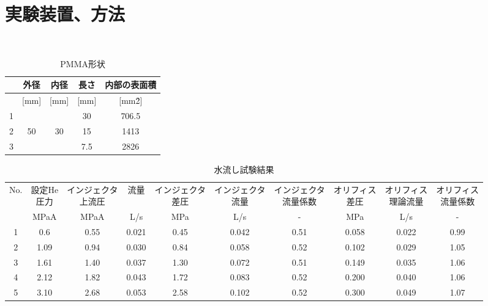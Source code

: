 \chapter{実験装置、方法}
\newcommand{\FigAddTwo}{./src/Chapter2/Figure}
%
%



\\
\begin{table}[htb]
\begin{center}
\caption{PMMA形状}
\begin{tabular}{|l|c|c|c|c|} \hline
 & 外径 & 内径  & 長さ  & 内部の表面積 \\ \hline
 & [mm] & [mm]  & [mm]  & [mm\^2]      \\ \hline
1&      &       & 30    &706.5         \\ \cline{4-5}
2& 50   & 30    & 15    &1413          \\ \cline{4-5}
3&      &       & 7.5   &2826          \\ \hline
\end{tabular}
\label{tab:PMMA}
\end{center}
\end{table}


\begin{table}[htb]
\begin{center}
\caption{水流し試験結果}
\scriptsize
\begin{tabular}{|c|c|c|c|c|c|c|c|c|c|} \hline
No. & \shortstack{設定He\\圧力} & \shortstack{インジェクタ\\上流圧} & 流量 & \shortstack{インジェクタ\\差圧} & \shortstack{インジェクタ\\流量} & \shortstack{インジェクタ\\流量係数} & \shortstack{オリフィス\\差圧} & \shortstack{オリフィス\\理論流量} & \shortstack{オリフィス\\流量係数} \\ \cline{2-10}
 & MPaA & MPaA & L/s & MPa & L/s & - & MPa & L/s & - \\ \hline
1 & 0.6 & 0.55 & 0.021 & 0.45 & 0.042 & 0.51 & 0.058 & 0.022 & 0.99 \\ \hline
2 & 1.09 & 0.94 & 0.030 & 0.84 & 0.058 & 0.52 & 0.102 & 0.029 & 1.05 \\ \hline
3 & 1.61 & 1.40 & 0.037 & 1.30 & 0.072 & 0.51 & 0.149 & 0.035 & 1.06 \\ \hline
4 & 2.12 & 1.82 & 0.043 & 1.72 & 0.083 & 0.52 & 0.200 & 0.040 & 1.06 \\ \hline
5 & 3.10 & 2.68 & 0.053 & 2.58 & 0.102 & 0.52 & 0.300 & 0.049 & 1.07 \\ \hline
\end{tabular}
\label{tab:Water}
\end{center}
\end{table}


